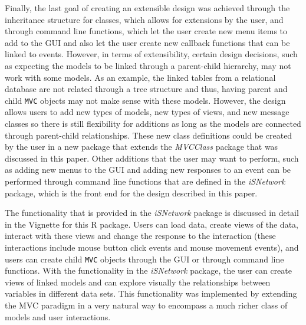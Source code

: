 \documentclass[11pt]{article}
\newcommand{\Robject}[1]{{\texttt{#1}}}
\newcommand{\Rpackage}[1]{{\textit{#1}}}
\begin{document}
Finally, the last goal of creating an extensible design was achieved through
the inheritance structure for classes, which allows for extensions by the
user, and through command line functions, which let the user create new menu
items to add to the GUI and also let the user create new callback functions
that can be linked to events.  However, in terms of extensibility, certain
design decisions, such as expecting the models to be linked through a
parent-child hierarchy, may not work with some models.  As an example, the
linked tables from a relational database are not related through a tree
structure and thus, having parent and child \Robject{MVC} objects may not make
sense with these models.  However, the design allows users to add new types
of models, new types of views, and new message classes so there is still
flexibility for additions as long as the models are connected through
parent-child relationships.  These new class definitions could be created by
the user in a new package that extends the \Rpackage{MVCClass} package that
was discussed in this paper.  Other additions that the user may want to
perform, such as adding new menus to the GUI and adding new responses to an
event can be performed through command line functions that are defined in the
\Rpackage{iSNetwork} package, which is the front end for the design
described in this paper. 

The functionality that is provided in the \Rpackage{iSNetwork} package is
discussed in detail in the Vignette for this R package.  Users can load data,
create views of the data, interact with these views and change the response to
the interaction (these interactions include mouse button click events and
mouse movement events), and users can create child \Robject{MVC} objects
through the GUI or through command line functions.  With the functionality in
the \Rpackage{iSNetwork} package, the user can create views of linked models
and can explore visually the relationships between variables in different data
sets.  This functionality was implemented by extending the MVC paradigm in a
very natural way to encompass a much richer class of models and user
interactions. 


\end{document}
